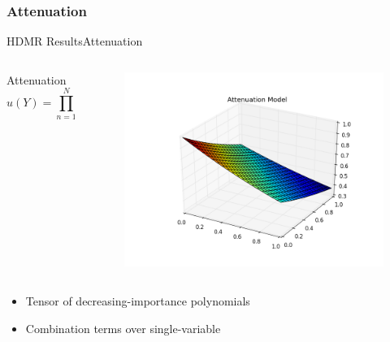 \documentclass{beamer}
\begin{document}
\subsubsection{Attenuation}
\begin{frame}{HDMR Results}{Attenuation}\vspace{-20pt}
  \begin{columns}
    \begin{column}{0.6\textwidth}
      \begin{block}{Attenuation}
        \[u(Y) = \prod_{n=1}^N \exp(-y_n/N)\]
      \end{block}
    \end{column}
    \begin{column}{0.4\textwidth}
        \begin{figure}[h!]
          \centering
          \includegraphics[width=\linewidth]{anlmodels/attenuate}
        \end{figure}
    \end{column}
  \end{columns}
  \begin{itemize}
    \item Tensor of decreasing-importance polynomials
    \item Combination terms over single-variable
  \end{itemize}
\end{frame}
\end{document}
